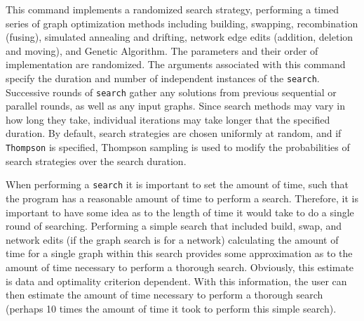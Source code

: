 	\begin{phygdescription}
		{This command implements a randomized search strategy, performing a timed 
		 series of graph optimization methods including building, swapping, 
		recombination (fusing), simulated annealing and drifting, network edge edits
		(addition, deletion and moving), and Genetic Algorithm. The parameters and 
		their order of implementation are randomized. The arguments 
		associated with this command specify the duration and number of independent 
		instances of the \texttt{search}. Successive rounds of \texttt{search} gather any 
		solutions from previous sequential or parallel rounds, as well as any input graphs. 
		Since search methods may vary in how long they take, individual iterations may 
		take longer that the specified duration.  By default, search strategies are chosen 
		uniformly at random, and if \texttt{Thompson} is specified, Thompson sampling 
		\cite{Thompson1933,WheelerThompson} is used to modify the probabilities 
		of search strategies over the search duration.
		
		When performing a \texttt{search} it is important to set the amount of time, 
		such that the program has a reasonable amount of time to perform a search. 
		Therefore, it is important to have some idea as to the length of time 
		it would take to do a single round of searching.  Performing a simple search 
		that included build, swap, and network edits (if the graph search is for a 
		network) calculating the 
		amount of time for a single graph within this search provides some 
		approximation as to the amount of time necessary to perform a thorough 
		search. Obviously, this estimate is data and optimality criterion dependent. 
		With this information, the user can then estimate the amount of time necessary 
		to perform a thorough search (perhaps 10 times the amount of time it took to 
		perform this simple search). 
		}
	\end{phygdescription}
			
